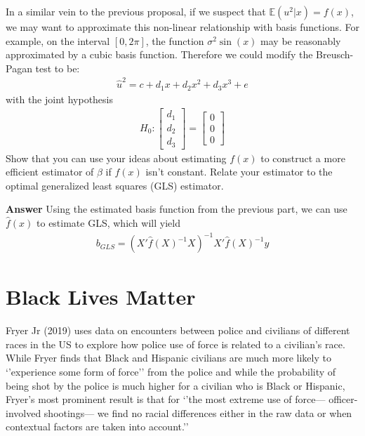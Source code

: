 \documentclass[11pt]{exam}
\begin{document}
\begin{questions}
In a similar vein to the previous proposal, if we suspect that
\(\mathbb{E}(u^2|x) = f(x)\), we may want to approximate this non-linear
relationship with basis functions. For example, on the interval
\([0, 2\pi]\), the function \(\sigma^2\sin(x)\) may be reasonably
approximated by a cubic basis function. Therefore we could modify the
Breusch-Pagan test to be:
\begin{align*}\hat{u}^2 = c + d_1x + d_2x^2 + d_3x^3 + e\end{align*}
with the joint hypothesis
\begin{align*}H_0: \begin{bmatrix} d_1 \\ d_2 \\ d_3 \end{bmatrix} = \begin{bmatrix} 0 \\ 0\\ 0 \end{bmatrix}\end{align*}
    \question Show that you can use your ideas about estimating \(f(x)\)
to construct a more efficient estimator of \(\beta\) if \(f(x)\) isn't
constant. Relate your estimator to the optimal generalized least squares
(GLS) estimator.

\textbf{Answer} Using the estimated basis function from the previous part, we can use $\hat{f}(x)$ to estimate GLS, which will yield
\begin{align*}
b_{GLS} = (X'\hat{f}(X)^{-1}X)^{-1}X'\hat{f}(X)^{-1}y
\end{align*}


\end{questions}

    \hypertarget{black-lives-matter}{%
\section{Black Lives Matter}\label{black-lives-matter}}

Fryer Jr (2019) uses data on encounters between police and civilians of
different races in the US to explore how police use of force is related
to a civilian's race. While Fryer finds that Black and Hispanic
civilians are much more likely to `'experience some form of force'' from
the police and while the probability of being shot by the police is much
higher for a civilian who is Black or Hispanic, Fryer's most prominent
result is that for `'the most extreme use of force--- officer-involved
shootings--- we find no racial differences either in the raw data or
when contextual factors are taken into account.''
\end{document}
